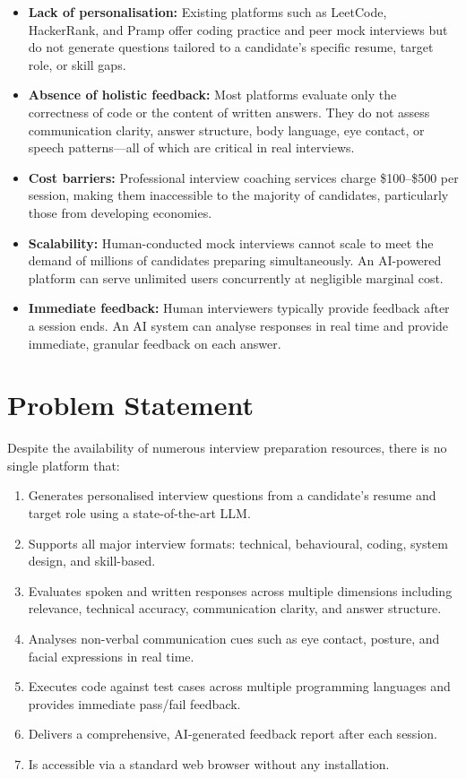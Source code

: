 \begin{itemize}
    \item \textbf{Lack of personalisation:} Existing platforms such as LeetCode, HackerRank, and Pramp offer coding practice and peer mock interviews but do not generate questions tailored to a candidate's specific resume, target role, or skill gaps.

    \item \textbf{Absence of holistic feedback:} Most platforms evaluate only the correctness of code or the content of written answers. They do not assess communication clarity, answer structure, body language, eye contact, or speech patterns---all of which are critical in real interviews.

    \item \textbf{Cost barriers:} Professional interview coaching services charge \$100--\$500 per session, making them inaccessible to the majority of candidates, particularly those from developing economies.

    \item \textbf{Scalability:} Human-conducted mock interviews cannot scale to meet the demand of millions of candidates preparing simultaneously. An AI-powered platform can serve unlimited users concurrently at negligible marginal cost.

    \item \textbf{Immediate feedback:} Human interviewers typically provide feedback after a session ends. An AI system can analyse responses in real time and provide immediate, granular feedback on each answer.
\end{itemize}

\section{Problem Statement}

Despite the availability of numerous interview preparation resources, there is no single platform that:
\begin{enumerate}
    \item Generates personalised interview questions from a candidate's resume and target role using a state-of-the-art LLM.
    \item Supports all major interview formats: technical, behavioural, coding, system design, and skill-based.
    \item Evaluates spoken and written responses across multiple dimensions including relevance, technical accuracy, communication clarity, and answer structure.
    \item Analyses non-verbal communication cues such as eye contact, posture, and facial expressions in real time.
    \item Executes code against test cases across multiple programming languages and provides immediate pass/fail feedback.
    \item Delivers a comprehensive, AI-generated feedback report after each session.
    \item Is accessible via a standard web browser without any installation.
\end{enumerate}

